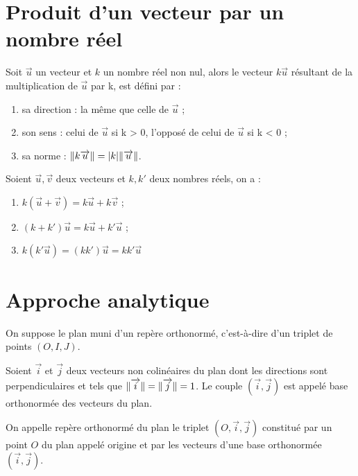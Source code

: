 \documentclass[a4paper, 12pt]{report}
\begin{document}
\section{Produit d'un vecteur par un nombre réel}

\begin{defn}
Soit $\vec{u}$ un vecteur et $k$ un nombre réel non nul, alors le vecteur $k \vec{u}$ résultant de la multiplication de $\vec{u}$ par k, est défini par :
\begin{enumerate}[label=(\roman*)]
\item sa direction : la même que celle de $\vec{u}$ ;
\item son sens : celui de $\vec{u}$ si k > 0, l’opposé de celui de $\vec{u}$ si k < 0 ;
\item sa norme : $\lVert k \overrightarrow{u}\rVert = \lvert k\rvert \lVert\overrightarrow{u}\rVert$.
\end{enumerate}
\end{defn}

\begin{prop}
Soient $\vec{u}, \vec{v}$ deux vecteurs et $k, k'$ deux nombres réels, on a :
\begin{enumerate}[label=(\roman*)]
\item $k(\vec{u} + \vec{v}) = k\vec{u} + k\vec{v}$ ;
\item $(k+k')\vec{u} = k\vec{u} + k'\vec{u}$ ;
\item $k(k' \vec{u}) = (kk' )\vec{u} = kk' \vec{u}$
\end{enumerate}
\end{prop}

\section{Approche analytique}

On suppose le plan muni d'un repère orthonormé, c'est-à-dire d'un triplet de points $(O, I, J)$.

\begin{defn}
Soient $\vec{i}$ et $\vec{j}$ deux vecteurs non colinéaires du plan dont les directions sont perpendiculaires et tels que
$\lVert\overrightarrow{i}\rVert = \lVert\overrightarrow{j}\rVert = 1$. Le couple $(\vec{i}, \vec{j})$ est appelé base orthonormée des vecteurs du plan.
\end{defn}

\begin{defn}
On appelle repère orthonormé du plan le triplet $(O, \vec{i}, \vec{j})$ constitué par un point $O$ du plan appelé
origine et par les vecteurs d’une base orthonormée $(\vec{i}, \vec{j})$.
\end{defn}
\end{document}

